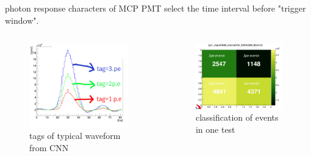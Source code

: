 \documentclass[11pt,compress,xcolor=x11names,UTF8]{beamer}
\begin{document}
\begin{frame}{photon response characters of MCP PMT }
select the time interval before "trigger window".
\begin{columns}
\begin{column}{.485\textwidth}
\begin{figure}
\centering
\includegraphics[width=0.94\textwidth]{figure/cnntags.png} %
\caption{tags of typical waveform from CNN}
\end{figure}
\end{column}
\begin{column}{.485\textwidth}
\begin{figure}
\centering
\includegraphics[width=0.94\textwidth]{figure/cnnres.png} %
\caption{classification of events in one test}
\end{figure}
\end{column}
\end{columns}
\end{frame}
\end{document}
